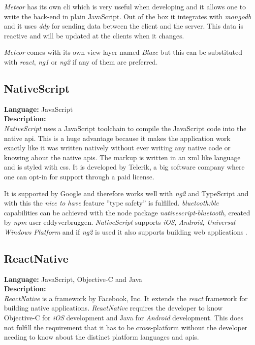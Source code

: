 \textit{Meteor} has its own \gls{cli} which is very useful when developing and it allows one to write the back-end in plain JavaScript. 
Out of the box it integrates with \textit{\gls{mongodb}} and it uses \textit{\gls{ddp}} for sending data between the client and the server. 
This data is reactive and will be updated at the clients when it changes.

\textit{Meteor} comes with its own view layer named \textit{Blaze} but this can be substituted with \textit{\gls{react}}, \textit{\gls{ng1}} or \textit{\gls{ng2}} if any of them are preferred.

\subsection*{NativeScript}
\textbf{Language:} JavaScript
\\
\textbf{Description:}
\\
\textit{NativeScript} uses a JavaScript toolchain to compile the JavaScript code into the native \gls{api}. 
This is a huge advantage because it makes the application work exactly like it was written natively without ever writing any native code or knowing about the native \glspl{api}. 
The markup is written in an \gls{xml} like language and is styled with \gls{css}.
It is developed by Telerik, a big software company where one can opt-in for support through a paid license. 

It is supported by Google and therefore works well with \textit{\gls{ng2}} and TypeScript and with this the \textit{nice to have} feature ''type safety'' is fulfilled. 
\textit{\gls{bluetooth:ble}} capabilities can be achieved with the \gls{node} package \textit{nativescript-bluetooth}, created by \textit{npm} user eddyverbruggen. 
\textit{NativeScript} supports \textit{iOS}, \textit{Android}, \textit{Universal Windows Platform} and if \textit{\gls{ng2}} is used it also supports building web applications \citep{preStudy:frameworks:nativescript}.


\subsection*{ReactNative}
\textbf{Language:} JavaScript, Objective-C and Java
\\
\textbf{Description:}
\\
\textit{ReactNative} is a framework by Facebook, Inc.
It extends the \textit{\gls{react}} framework for building native applications. 
\textit{ReactNative} requires the developer to know Objective-C for \textit{iOS} development and Java for \textit{Android} development. 
This does not fulfill the requirement that it has to be cross-platform without the developer needing to know about the distinct platform languages and \glspl{api}.


